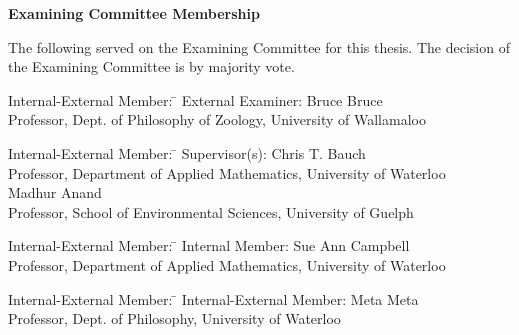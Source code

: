 \cleardoublepage %

 
\begin{center}\textbf{Examining Committee Membership}\end{center}
  \noindent
The following served on the Examining Committee for this thesis. The decision of the Examining Committee is by majority vote.
  \bigskip
  
  \noindent
\begin{tabbing}
Internal-External Member: \=  \kill %
External Examiner: \>  Bruce Bruce \\ 
\> Professor, Dept. of Philosophy of Zoology, University of Wallamaloo \\
\end{tabbing} 
  \bigskip
  
  \noindent
\begin{tabbing}
Internal-External Member: \=  \kill %
Supervisor(s): \> Chris T. Bauch \\
\> Professor, Department of Applied Mathematics, University of Waterloo \\
\> Madhur Anand \\
\> Professor, School of Environmental Sciences, University of Guelph \\
\end{tabbing}
  \bigskip
  
  \noindent
  \begin{tabbing}
Internal-External Member: \=  \kill %
Internal Member: \> Sue Ann Campbell \\
\> Professor, Department of Applied Mathematics, University of Waterloo \\
\end{tabbing}
  \bigskip
  
  \noindent
\begin{tabbing}
Internal-External Member: \=  \kill %
Internal-External Member: \> Meta Meta \\
\> Professor, Dept. of Philosophy, University of Waterloo \\
\end{tabbing}
  \bigskip
  
